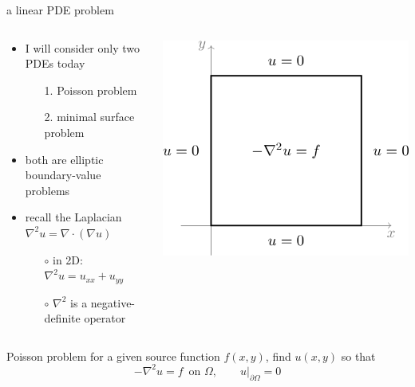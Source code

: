 \documentclass[10pt,
               svgnames,
               hyperref={colorlinks,citecolor=DeepPink4,linkcolor=FireBrick,urlcolor=Maroon},
               usepdftitle=false]{beamer}
\newcommand{\grad}{\nabla}
\newcommand{\Div}{\nabla \cdot}
\begin{document}
\begin{frame}{a linear PDE problem}
\begin{columns}
\begin{column}{0.6\textwidth}
\begin{itemize}
\item I will consider only two PDEs today
    \begin{itemize}
    \item[1.] Poisson problem
    \item[2.] minimal surface problem
    \end{itemize}
\item both are elliptic boundary-value problems
\item recall the Laplacian $\grad^2 u =\Div(\grad u)$
    \begin{itemize}
    \item[$\circ$] in 2D: \quad $\grad^2 u = u_{xx} + u_{yy}$
    \item[$\circ$] $\grad^2$ is a negative-definite operator
    \end{itemize}
\end{itemize}
\end{column}
\begin{column}{0.4\textwidth}
\hfill \includegraphics[width=\textwidth]{images/poisson.png}
\end{column}
\end{columns}

\bigskip
\begin{block}{Poisson problem} for a given source function $f(x,y)$, find $u(x,y)$ so that
    $$-\grad^2 u = f \, \text{ on } \Omega, \qquad u\big|_{\partial \Omega} = 0$$
\end{block}
\end{frame}
\end{document}
